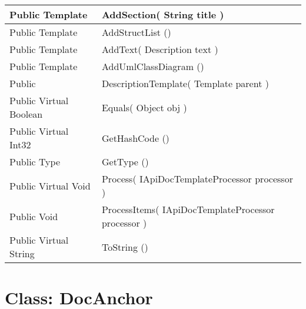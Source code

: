 \documentclass[11pt, oneside, a4paper]{book}
\begin{document}
\begin{center}
\begin{tabular}{| p{3cm} | p{12cm} | }
\hline
 Public  Template &  AddSection(\hypertarget{SoftwareEngineeringTools.{}Documentation.{}DescriptionTemplate.{}AddSection\_String}{} String  title  )\\
\hline
 Public  Template &  AddStructList ()\hypertarget{SoftwareEngineeringTools.{}Documentation.{}DescriptionTemplate.{}AddStructList}{}\\
\hline
 Public  Template &  AddText(\hypertarget{SoftwareEngineeringTools.{}Documentation.{}DescriptionTemplate.{}AddText\_Description}{} Description  text  )\\
\hline
 Public  Template &  AddUmlClassDiagram ()\hypertarget{SoftwareEngineeringTools.{}Documentation.{}DescriptionTemplate.{}AddUmlClassDiagram}{}\\
\hline
 Public  &  DescriptionTemplate(\hypertarget{SoftwareEngineeringTools.{}Documentation.{}DescriptionTemplate.{}DescriptionTemplate\_Template}{} Template  parent  )\\
\hline
 Public  Virtual  Boolean &  Equals(\hypertarget{SoftwareEngineeringTools.{}Documentation.{}DescriptionTemplate.{}Equals\_Object}{} Object  obj  )\\
\hline
 Public  Virtual  Int32 &  GetHashCode ()\hypertarget{SoftwareEngineeringTools.{}Documentation.{}DescriptionTemplate.{}GetHashCode}{}\\
\hline
 Public  Type &  GetType ()\hypertarget{SoftwareEngineeringTools.{}Documentation.{}DescriptionTemplate.{}GetType}{}\\
\hline
 Public  Virtual  Void &  Process(\hypertarget{SoftwareEngineeringTools.{}Documentation.{}DescriptionTemplate.{}Process\_IApiDocTemplateProcessor}{} IApiDocTemplateProcessor  processor  )\\
\hline
 Public  Void &  ProcessItems(\hypertarget{SoftwareEngineeringTools.{}Documentation.{}DescriptionTemplate.{}ProcessItems\_IApiDocTemplateProcessor}{} IApiDocTemplateProcessor  processor  )\\
\hline
 Public  Virtual  String &  ToString ()\hypertarget{SoftwareEngineeringTools.{}Documentation.{}DescriptionTemplate.{}ToString}{}\\
\hline
\end{tabular}
\end{center}
 


\hypertarget{SoftwareEngineeringTools.{}Documentation.{}DocAnchor}{}
\section{Class: DocAnchor}
\end{document}
